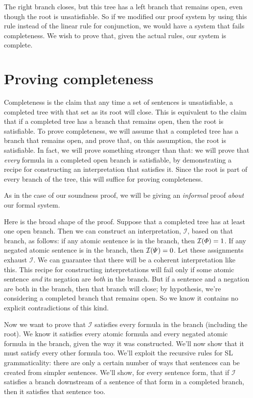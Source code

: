 The right branch closes, but this tree has a left branch that remains open, even though the root is unsatisfiable. So if we modified our proof system by using this rule instead of the linear rule for conjunction, we would have a system that fails completeness. We wish to prove that, given the actual rules, our system is complete.

\section{Proving completeness}
\label{sec.completenessproof}
Completeness is the claim that any time a set of sentences is unsatisfiable, a completed tree with that set as its root will close. This is equivalent to the claim that if a completed tree has a branch that remains open, then the root is satisfiable. To prove completeness, we will assume that a completed tree has a branch that remains open, and prove that, on this assumption, the root is satisfiable. In fact, we will prove something stronger than that: we will prove that \emph{every} formula in a completed open branch is satisfiable, by demonstrating a recipe for constructing an interpretation that satisfies it. Since the root is part of every branch of the tree, this will suffice for proving completeness.

As in the case of our soundness proof, we will be giving an \emph{informal} proof \emph{about} our formal system.

Here is the broad shape of the proof. Suppose that a completed tree has at least one open branch. Then we can construct an interpretation, $\mathcal{I}$, based on that branch, as follows: if any atomic sentence \metaA{} is in the branch, then $\mathcal{I}(\varPhi{})=1$. If any negated atomic sentence \enot\metaB{} is in the branch, then $\mathcal{I}(\varPsi{})=0$. Let these assignments exhaust $\mathcal{I}$. We can guarantee that there will be a coherent interpretation like this. This recipe for constructing interpretations will fail only if some atomic sentence \emph{and} its negation are \emph{both} in the branch. But if a sentence and a negation are both in the branch, then that branch will close; by hypothesis, we're considering a completed branch that remains open. So we know it contains no explicit contradictions of this kind.

Now we want to prove that $\mathcal{I}$ satisfies every formula in the branch (including the root). We know it satisfies every atomic formula and every negated atomic formula in the branch, given the way it was constructed. We'll now show that it must satisfy every other formula too. We'll exploit the recursive rules for SL grammaticality: there are only a certain number of ways that sentences can be created from simpler sentences. We'll show, for every sentence form, that if $\mathcal{I}$ satisfies a branch downstream of a sentence of that form in a completed branch, then it satisfies that sentence too.

